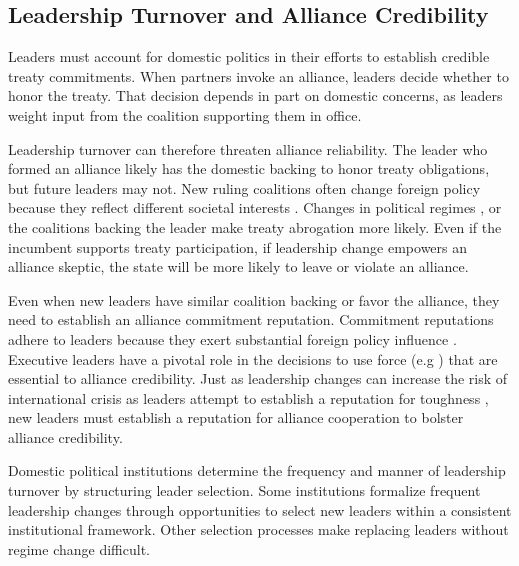 \documentclass[12pt]{article}
\begin{document}
\subsection{Leadership Turnover and Alliance Credibility}


Leaders must account for domestic politics in their efforts to establish credible treaty commitments.
When partners invoke an alliance, leaders decide whether to honor the treaty. 
That decision depends in part on domestic concerns, as leaders weight input from the coalition supporting them in office. 


Leadership turnover can therefore threaten alliance reliability.
The leader who formed an alliance likely has the domestic backing to honor treaty obligations, but future leaders may not. 
New ruling coalitions often change foreign policy because they reflect different societal interests \citep{Lobell2004, Narizny2007, Mattesetal2016}.  
Changes in political regimes \citep{LeedsSavun2007}, or the coalitions backing the leader \citep{Leedsetal2009} make treaty abrogation more likely. 
Even if the incumbent supports treaty participation, if leadership change empowers an alliance skeptic, the state will be more likely to leave or violate an alliance.  


Even when new leaders have similar coalition backing or favor the alliance, they need to establish an alliance commitment reputation.
Commitment reputations adhere to leaders because they exert substantial foreign policy influence \citep{Renshonetal2018}.
Executive leaders have a pivotal role in the decisions to use force (e.g \citep{Colgan2013, ColganWeeks2015}) that are essential to alliance credibility. 
Just as leadership changes can increase the risk of international crisis as leaders attempt to establish a reputation for toughness \citep{Wolford2007}, new leaders must establish a reputation for alliance cooperation to bolster alliance credibility.


Domestic political institutions determine the frequency and manner of leadership turnover by structuring leader selection. 
Some institutions formalize frequent leadership changes through opportunities to select new leaders within a consistent institutional framework. 
Other selection processes make replacing leaders without regime change difficult. 
\end{document}
